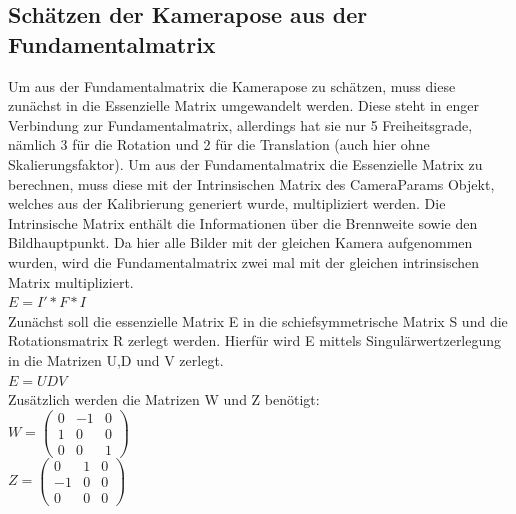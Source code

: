 \subsection{Schätzen der Kamerapose aus der Fundamentalmatrix}
\label{sec:Schätzen der Kamerapose aus der Fundamentalmatrix}
Um aus der Fundamentalmatrix die Kamerapose zu schätzen, muss diese zunächst in die Essenzielle Matrix umgewandelt werden. Diese steht in enger Verbindung zur Fundamentalmatrix, allerdings hat sie nur 5 Freiheitsgrade, nämlich 3 für die Rotation und 2 für die Translation (auch hier ohne Skalierungsfaktor). Um aus der Fundamentalmatrix die Essenzielle Matrix zu berechnen, muss diese mit der Intrinsischen Matrix des CameraParams Objekt, welches aus der Kalibrierung generiert wurde, multipliziert werden. Die Intrinsische Matrix enthält die Informationen über die Brennweite sowie den Bildhauptpunkt. Da hier alle Bilder mit der gleichen Kamera aufgenommen wurden, wird die Fundamentalmatrix zwei mal mit der gleichen intrinsischen Matrix multipliziert.
\\
$E = I' * F * I$
\\
Zunächst soll die essenzielle Matrix E in die schiefsymmetrische Matrix S und die Rotationsmatrix R zerlegt werden. Hierfür wird E mittels Singulärwertzerlegung in die Matrizen U,D und V zerlegt.
\\
$E = UDV$
\\
Zusätzlich werden die Matrizen W und Z benötigt:
\\
$W = \begin{pmatrix} 0 & -1 & 0 \\1 & 0 & 0\\0 & 0 & 1\end{pmatrix}$
\\
$Z = \begin{pmatrix} 0 & 1 & 0 \\-1 & 0 & 0\\0 & 0 & 0\end{pmatrix}$ 

